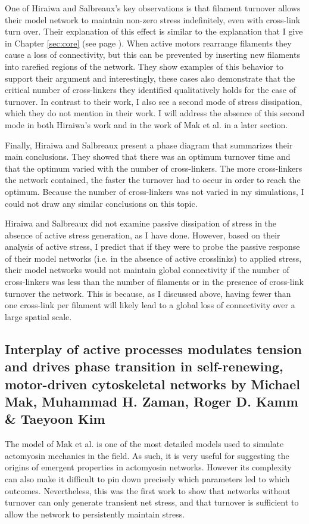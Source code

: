 One of Hiraiwa and Salbreaux's key observations is that filament turnover allows their model network to maintain non-zero stress indefinitely, even with cross-link turn over.  Their explanation of this effect is similar to the explanation that I give in Chapter \ref{sec:core} (see page \pageref{pg:explainit}). When active motors rearrange filaments they cause a loss of connectivity, but this can be prevented by inserting new filaments into rarefied regions of the network. They show examples of this behavior to support their argument and interestingly, these cases also demonstrate that the critical number of cross-linkers they identified qualitatively holds for the case of turnover.  In contrast to their work, I also see a second mode of stress dissipation, which they do not mention in their work.  I will address the absence of this second mode in both Hiraiwa's work and in the work of Mak et al.  in a later section. 

Finally, Hiraiwa and Salbreaux present a phase diagram that summarizes their main conclusions. They showed that there was an optimum turnover time and that the optimum varied with the number of cross-linkers.  The more cross-linkers the network contained, the faster the turnover had to occur in order to reach the optimum.  Because the number of cross-linkers was not varied in my simulations, I could not draw any similar conclusions on this topic.

Hiraiwa and Salbreaux did not examine passive dissipation of stress in the absence of active stress generation, as I have done. However, based on their analysis of active stress, I predict that if they were to probe the passive response of their model networks (i.e. in the absence of active crosslinks) to applied stress, their model networks would not  maintain global connectivity if the number of cross-linkers was less than the number of filaments or in the presence of cross-link turnover the network. This is because, as I discussed above, having fewer than one cross-link per filament will likely lead to a global loss of connectivity over a large spatial scale.   

\subsection{Interplay of active processes modulates tension and drives phase transition in self-renewing, motor-driven cytoskeletal networks by    Michael Mak, Muhammad H. Zaman, Roger D. Kamm \& Taeyoon Kim}

The model of Mak et al. \cite{Mak:2016aa} is one of the most detailed models used to simulate actomyosin mechanics in the field.  As such, it is very useful for suggesting the origins of emergent properties in actomyosin networks. However its complexity can also make it difficult to pin down precisely which parameters led to which outcomes.    Nevertheless, this was the first work to show that networks without turnover can only generate transient net stress,  and that turnover is sufficient to allow the network to persistently maintain stress.

